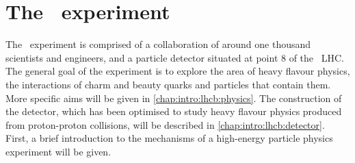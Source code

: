 \chapter{The \lhcb\ experiment}
\label{chap:intro:lhcb}

The \lhcb\ experiment is comprised of a collaboration of around one thousand 
scientists and engineers, and a particle detector situated at point 8 of the 
\cern\ \ac{LHC}.
The general goal of the experiment is to explore the area of heavy flavour 
physics, the interactions of charm and beauty quarks and particles that contain 
them.
More specific aims will be given in \cref{chap:intro:lhcb:physics}.
The construction of the detector, which has been optimised to study heavy 
flavour physics produced from proton-proton collisions, will be described in 
\cref{chap:intro:lhcb:detector}.
First, a brief introduction to the mechanisms of a high-energy particle physics 
experiment will be given.



